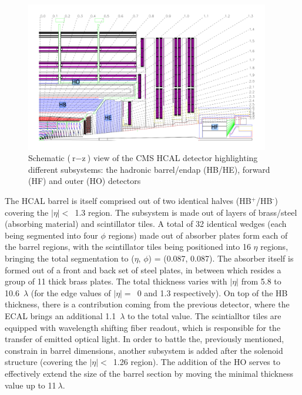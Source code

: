 \begin{figure}[htbp]
  \centering
    \includegraphics[width=0.95\textwidth]{CMS_experiment/HCAL_structure.png}
  \caption[Schematic ($\text{r}-\text{z}$) view of the CMS HCAL detector highlighting different subsystems: the hadronic barrel/endap (HB/HE), forward (HF) and outer (HO) detectors.]{Schematic ($\text{r}-\text{z}$) view of the CMS HCAL detector highlighting different subsystems: the hadronic barrel/endap (HB/HE), forward (HF) and outer (HO) detectors~\cite{cms:paper}}
  \label{fig:hcal}
\end{figure}

\hspace{10pt} The HCAL barrel is itself comprised out of two identical halves (HB$^{\text{+}}$/HB$^{\text{-}}$) covering the $|\eta|<$~1.3 region. The subsystem is made out of layers of brass/steel (absorbing material) and scintillator tiles. A total of 32 identical wedges (each being segmented into four $\phi$ regions) made out of absorber plates form each of the barrel regions, with the scintillator tiles being positioned into 16 $\eta$ regions, bringing the total segmentation to ($\eta$, $\phi$) = (0.087, 0.087). The absorber itself is formed out of a front and back set of steel plates, in between which resides a group of 11 thick brass plates. The total thickness varies with $|\eta|$ from 5.8 to 10.6~$\lambda$ (for the edge values of $|\eta|=$~0 and 1.3 respectively). On top of the HB thickness, there is a contribution coming from the previous detector, where the ECAL brings an additional 1.1~$\lambda$ to the total value. The scintialltor tiles are equipped with wavelength shifting fiber readout, which is responsible for the transfer of emitted optical light. In order to battle the, previously mentioned, constrain in barrel dimensions, another subsystem is added after the solenoid structure (covering the $|\eta|<$~1.26 region). The addition of the HO serves to effectively extend the size of the barrel section by moving the minimal thickness value up to 11$~\lambda$.

